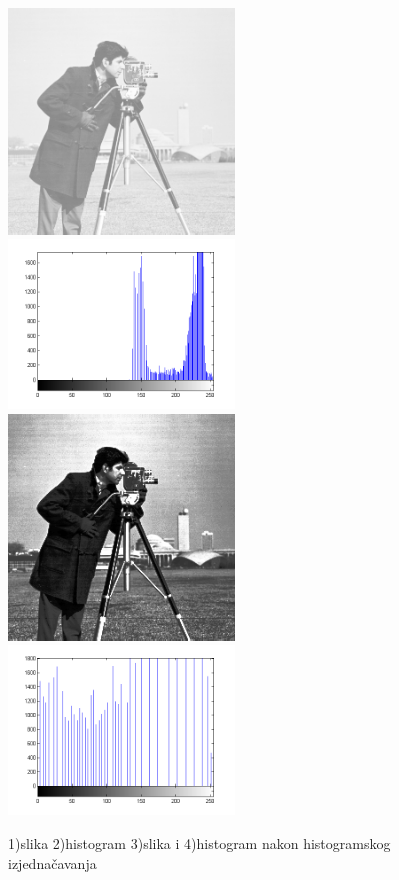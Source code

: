 \documentclass[a4paper,12pt,titlepage]{article}
\begin{document}
\begin{figure}[ht!]
\centering
\includegraphics[width=60mm]{img/imgPow2.png}
\includegraphics[width=60mm]{img/histImgPow2.png}
\includegraphics[width=60mm]{img/histEq.png}
\includegraphics[width=60mm]{img/histEqhist.png}
\caption{1)slika 2)histogram 3)slika i 4)histogram nakon histogramskog izjednačavanja}
\label{overflow}
\end{figure}
\end{document}
